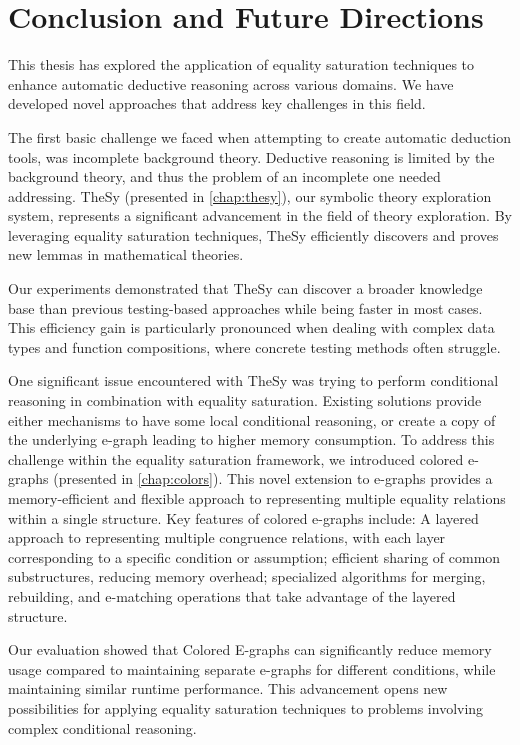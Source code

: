 \chapter{Conclusion and Future Directions}
\label{chap:conclusion}

This thesis has explored the application of equality saturation techniques to enhance automatic deductive reasoning across various domains.
We have developed novel approaches that address key challenges in this field.

The first basic challenge we faced when attempting to create automatic deduction tools, was incomplete background theory. 
Deductive reasoning is limited by the background theory, and thus the problem of an incomplete one needed addressing.
TheSy (presented in \autoref{chap:thesy}), our symbolic theory exploration system, represents a significant advancement in the field of theory exploration.
By leveraging equality saturation techniques, TheSy efficiently discovers and proves new lemmas in mathematical theories. 

Our experiments demonstrated that TheSy can discover a broader knowledge base than previous testing-based approaches while being faster in most cases. 
This efficiency gain is particularly pronounced when dealing with complex data types and function compositions, where concrete testing methods often struggle.

One significant issue encountered with TheSy was trying to perform conditional reasoning in combination with equality saturation.
Existing solutions provide either mechanisms to have some local conditional reasoning, or create a copy of the underlying e-graph leading to higher memory consumption.
To address this challenge within the equality saturation framework, we introduced colored e-graphs (presented in \autoref{chap:colors}).
This novel extension to e-graphs provides a memory-efficient and flexible approach to representing multiple equality relations within a single structure. Key features of colored e-graphs include:
A layered approach to representing multiple congruence relations, with each layer corresponding to a specific condition or assumption;
efficient sharing of common substructures, reducing memory overhead;
specialized algorithms for merging, rebuilding, and e-matching operations that take advantage of the layered structure.

Our evaluation showed that Colored E-graphs can significantly reduce memory usage compared to maintaining separate e-graphs for different conditions, while maintaining similar runtime performance. 
This advancement opens new possibilities for applying equality saturation techniques to problems involving complex conditional reasoning.

